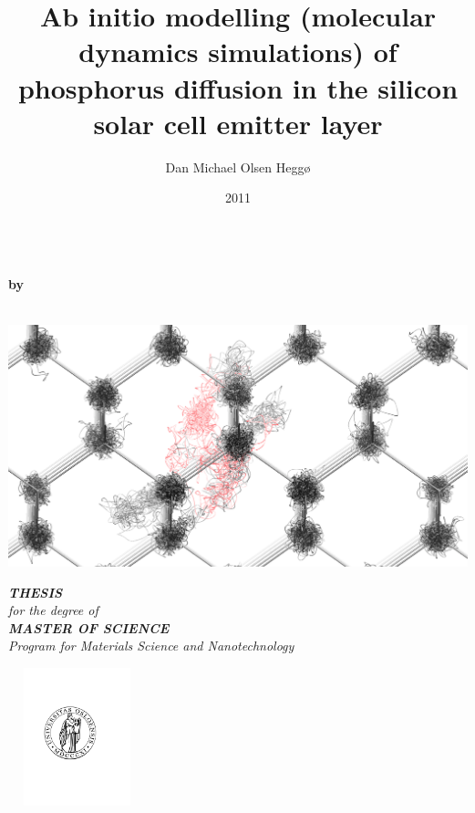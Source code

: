 \documentclass[a4paper]{article}
\begin{document}
\title{Ab initio modelling (molecular dynamics simulations) of phosphorus diffusion in the silicon solar cell emitter layer}
\author{Dan Michael Olsen Heggø}
\date{2011}


\pagestyle{empty}
\begin{center}        %
  \LARGE
  \textbf{\thetitle} \\
  \Large
  \vspace{5mm}
  \textbf{by} \\
  \vspace{5mm}
  \large
  \textbf{\theauthor} \\
  \vspace{12mm}
  \centerline{\includegraphics[width=14cm]{dance1.png}}
  \vspace{12mm}
  \Large
  {\bf{\textsl{THESIS}}} \\
  \textsl{for the degree of} \\
  \vspace{2mm}
  {\bf{\textsl{MASTER OF SCIENCE}}} \\
  \vspace{2mm}
  {\large \textsl {Program for Materials Science and Nanotechnology}}\\
  \vspace{5mm}
  \centerline{\includegraphics[width=4cm,height=4cm]{uiologo.pdf}}

\end{center}
\end{document}
